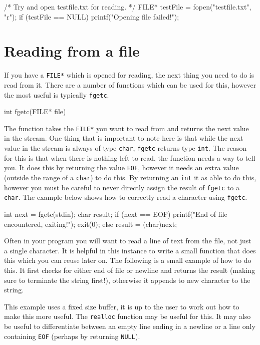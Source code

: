 \begin{codeblock}
/* Try and open testfile.txt for reading. */ 
FILE* testFile = fopen("testfile.txt", "r");
if (testFile == NULL) {
    printf("Opening file failed!\n");
}
\end{codeblock}

\section{Reading from a file}

If you have a \texttt{FILE*} which is opened for reading, the next thing you need to do is read from it.
There are a number of functions which can be used for this, however the most useful is typically \texttt{fgetc}.

\begin{codeinline}
int fgetc(FILE* file)
\end{codeinline}

The function takes the \texttt{FILE*} you want to read from and returns the next value in the stream.
One thing that is important to note here is that while the next value in the stream is always of type \texttt{char}, \texttt{fgetc} returns type \texttt{int}. 
The reason for this is that when there is nothing left to read, the function needs a way to tell you.
It does this by returning the value \texttt{EOF}, however it needs an extra value (outside the range of a \texttt{char}) to do this.
By returning an \texttt{int} it as able to do this, however you must be careful to never directly assign the result of \texttt{fgetc} to a \texttt{char}.
The example below shows how to correctly read a character using \texttt{fgetc}.

\begin{codeblock}
int next = fgetc(stdin);
char result;
if (next == EOF) {
    printf("End of file encountered, exiting!\n");
    exit(0);
} else {
  result = (char)next;
}
\end{codeblock}

Often in your program you will want to read a line of text from the file, not just a single character.
It is helpful in this instance to write a small function that does this which you can reuse later on.
The following is a small example of how to do this.
It first checks for either end of file or newline and returns the result (making sure to terminate the string first!), otherwise it appends to new character to the string.

This example uses a fixed size buffer, it is up to the user to work out how to make this more useful.
The \texttt{realloc} function may be useful for this.
It may also be useful to differentiate between an empty line ending in a newline or a line only containing \texttt{EOF} (perhaps by returning \texttt{NULL}).

